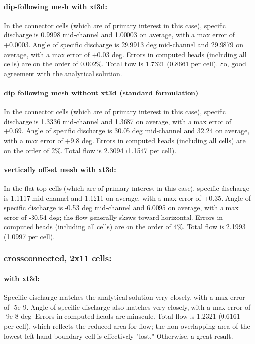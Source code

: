 \documentclass{article}
\begin{document}
\paragraph{dip-following mesh with xt3d:} In the connector cells (which are of primary interest in this case), specific discharge is 0.9998 mid-channel and 1.00003 on average, with a max error of +0.0003. Angle of specific discharge is 29.9913 deg mid-channel and 29.9879 on average, with a max error of +0.03 deg. Errors in computed heads (including all cells) are on the order of 0.002\%. Total flow is 1.7321 (0.8661 per cell). So, good agreement with the analytical solution.

\paragraph{dip-following mesh without xt3d (standard formulation)} In the connector cells (which are of primary interest in this case), specific discharge is 1.3336 mid-channel and 1.3687 on average, with a max error of +0.69. Angle of specific discharge is 30.05 deg mid-channel and 32.24 on average, with a max error of +9.8 deg. Errors in computed heads (including all cells) are on the order of 2\%. Total flow is 2.3094 (1.1547 per cell).

\paragraph{vertically offset mesh with xt3d:} In the flat-top cells (which are of primary interest in this case), specific discharge is 1.1117 mid-channel and 1.1211 on average, with a max error of +0.35. Angle of specific discharge is -0.53 deg mid-channel and 6.0095 on average, with a max error of -30.54 deg; the flow generally skews toward horizontal. Errors in computed heads (including all cells) are on the order of 4\%. Total flow is 2.1993 (1.0997 per cell).

\subsubsection{crossconnected, 2x11 cells:}

\paragraph{with xt3d:} Specific discharge matches the analytical solution very closely, with a max error of -5e-9. Angle of specific discharge also matches very closely, with a max error of -9e-8 deg. Errors in computed heads are minscule. Total flow is 1.2321 (0.6161 per cell), which reflects the reduced area for flow; the non-overlapping area of the lowest left-hand boundary cell is effectively "lost." Otherwise, a great result.
\end{document}
